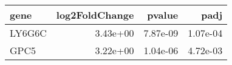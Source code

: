 \begin{tabular}{lrrr}
\toprule
  gene &  log2FoldChange &   pvalue &     padj \\
\midrule
LY6G6C &        3.43e+00 & 7.87e-09 & 1.07e-04 \\
  GPC5 &        3.22e+00 & 1.04e-06 & 4.72e-03 \\
\bottomrule
\end{tabular}
